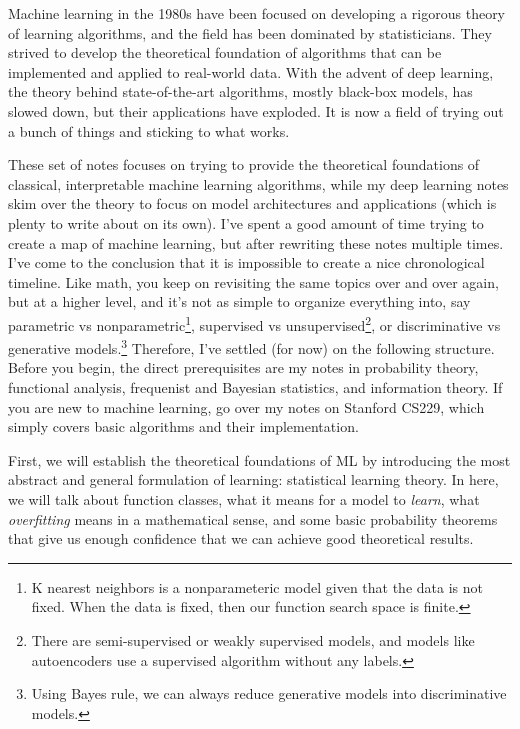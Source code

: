 Machine learning in the 1980s have been focused on developing a rigorous theory of learning algorithms, and the field has been dominated by statisticians. They strived to develop the theoretical foundation of algorithms that can be implemented and applied to real-world data. With the advent of deep learning, the theory behind state-of-the-art algorithms, mostly black-box models, has slowed down, but their applications have exploded. It is now a field of trying out a bunch of things and sticking to what works. 

These set of notes focuses on trying to provide the theoretical foundations of classical, interpretable machine learning algorithms, while my deep learning notes skim over the theory to focus on model architectures and applications (which is plenty to write about on its own). I've spent a good amount of time trying to create a map of machine learning, but after rewriting these notes multiple times. I've come to the conclusion that it is impossible to create a nice chronological timeline. Like math, you keep on revisiting the same topics over and over again, but at a higher level, and it's not as simple to organize everything into, say parametric vs nonparametric\footnote{K nearest neighbors is a nonparameteric model given that the data is not fixed. When the data is fixed, then our function search space is finite.}, supervised vs unsupervised\footnote{There are semi-supervised or weakly supervised models, and models like autoencoders use a supervised algorithm without any labels.}, or discriminative vs generative models.\footnote{Using Bayes rule, we can always reduce generative models into discriminative models.} Therefore, I've settled (for now) on the following structure. Before you begin, the direct prerequisites are my notes in probability theory, functional analysis, frequenist and Bayesian statistics, and information theory. If you are new to machine learning, go over my notes on Stanford CS229, which simply covers basic algorithms and their implementation. 

First, we will establish the theoretical foundations of ML by introducing the most abstract and general formulation of learning: statistical learning theory. In here, we will talk about function classes, what it means for a model to \textit{learn}, what \textit{overfitting} means in a mathematical sense, and some basic probability theorems that give us enough confidence that we can achieve good theoretical results. 

